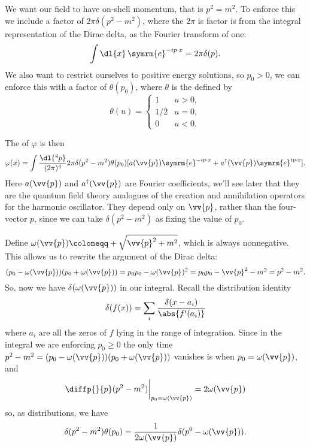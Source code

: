 \documentclass[fleqn]{NotesClass}
\newcommand{\e}{\symrm{e}}
\newcommand{\hermit}{{\dagger}}
\newcommand{\heaviside}{\theta}
\begin{document}
    We want our field to have on-shell momentum, that is \(p^2 = m^2\).
    To enforce this we include a factor of \(2\pi \delta(p^2 - m^2)\), where the \(2\pi\) is factor is from the integral representation of the Dirac delta, as the Fourier transform of one:
    \begin{equation}
        \int \dl{x} \, \e^{-ip \cdot x} = 2\pi \delta(p).
    \end{equation}
    We also want to restrict ourselves to positive energy solutions, so \(p_0 > 0\), we can enforce this with a factor of \(\heaviside(p_0)\), where \(\heaviside\)\index{\(\heaviside\), Heaviside step function} is the  defined by
    \begin{equation}
        \heaviside(u) = 
        \begin{cases}
            1 & u > 0,\\
            1/2 & u = 0,\\
            0 & u < 0.
        \end{cases}
    \end{equation}
    
    The  of \(\varphi\) is then
    \begin{equation}
        \varphi(x) = \int \frac{\dl{^4p}}{(2\pi)^4} 2\pi \delta(p^2 - m^2) \heaviside(p_0) [ a(\vv{p}) \e^{-ip\cdot x} + a^\hermit(\vv{p}) \e^{i p \cdot x} ].
    \end{equation}
    Here \(a(\vv{p})\) and \(a^\hermit(\vv{p})\) are Fourier coefficients, we'll see later that they are the quantum field theory analogues of the creation and annihilation operators for the harmonic oscillator.
    They depend only on \(\vv{p}\), rather than the four-vector \(p\), since we can take \(\delta(p^2 - m^2)\) as fixing the value of \(p_0\).
    
    Define \(\omega(\vv{p}) \coloneqq +\sqrt{\vv{p}^2 + m^2}\), which is always nonnegative.
    This allows us to rewrite the argument of the Dirac delta:
    \begin{equation}
        (p_0 - \omega(\vv{p}))(p_0 + \omega(\vv{p})) = p_0p_0 - \omega(\vv{p})^2 = p_0p_0 - \vv{p}^2 -m^2 = p^2 - m^2.
    \end{equation}
    So, now we have \(\delta(\omega(\vv{p}))\) in our integral.
    Recall the distribution identity
    \begin{equation}
        \delta(f(x)) = \sum_i \frac{\delta(x - a_i)}{\abs{f'(a_i)}}
    \end{equation}
    where \(a_i\) are all the zeros of \(f\) lying in the range of integration.
    Since in the integral we are enforcing \(p_0 \ge 0\) the only time \(p^2 - m^2 = (p_0 - \omega(\vv{p}))(p_0 + \omega(\vv{p}))\) vanishes is when \(p_0 = \omega(\vv{p})\), and
    \begin{equation}
        \diffp{}{p} (p^2 - m^2) \bigg|_{p_0 = \omega(\vv{p})} = 2\omega(\vv{p})
    \end{equation}
    so, as distributions, we have
    \begin{equation}
        \delta(p^2 - m^2)\heaviside(p_0) = \frac{1}{2\omega(\vv{p})} \delta(p^0 - \omega(\vv{p})).
    \end{equation}
    
\end{document}
